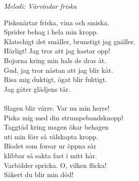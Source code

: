 {\footnotesize\textit{Melodi: Vårvindar friska}}\par
\vspace{10pt}
Pisksnärtar friska, vina och smiska.\\
Sprider behag i hela min kropp.\\
Klatschigt det smäller, brunstigt jag gnäller.\\
Härligt! Jag tror att jag kastar opp!\\
Bojorna kring min hals de dras åt.\\
Gud, jag tror nästan att jag blir kåt.\\
Risa mig duktigt, ögat blir fuktigt.\\
Jag gåter glädjens tår.\\
\\
Slagen blir värre. Var nu min herre!\\
Piska mig med din strumpebandsknopp!\\
Taggtåd kring magen ökar behagen\\
uti min förr så välskapta kropp.\\
Blodet som forsar ur öppna sår\\
klibbar så sakta fast i mitt hår.\\
Varbölder spricka. O, vilken flicka!\\
Säkert du blir min död!
